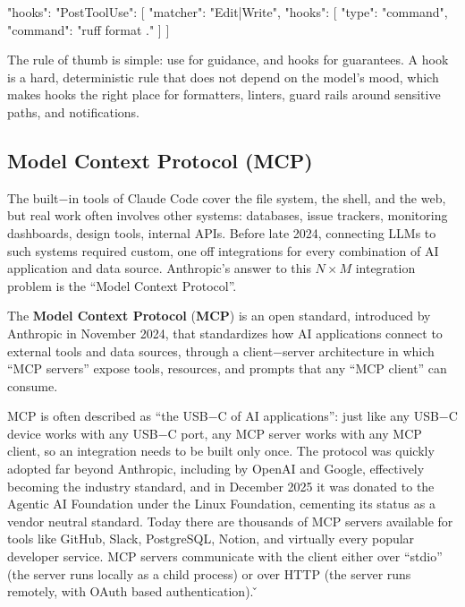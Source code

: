\begin{block}
{
  "hooks": {
    "PostToolUse": [
      {
        "matcher": "Edit|Write",
        "hooks": [
          {
            "type": "command",
            "command": "ruff format ."
          }
        ]
      }
    ]
  }
}
\end{block}

The rule of thumb is simple: use  for guidance, and hooks for guarantees. A hook is a hard,
deterministic rule that does not depend on the model's mood, which makes hooks the right place for formatters,
linters, guard rails around sensitive paths, and notifications.

\subsection{Model Context Protocol (MCP)}

The built$-$in tools of Claude Code cover the file system, the shell, and the web, but real work often involves other
systems: databases, issue trackers, monitoring dashboards, design tools, internal APIs. Before late 2024, connecting
LLMs to such systems required custom, one off integrations for every combination of AI application and data source.
Anthropic's answer to this $N \times M$ integration problem is the ``Model Context Protocol''.

The \textbf{Model Context Protocol} (\textbf{MCP}) is an open standard, introduced by Anthropic in November 2024,
that standardizes how AI applications connect to external tools and data sources, through a client$-$server
architecture in which ``MCP servers'' expose tools, resources, and prompts that any ``MCP client'' can consume.
\ed

MCP is often described as ``the USB$-$C of AI applications'': just like any USB$-$C device works with any USB$-$C
port, any MCP server works with any MCP client, so an integration needs to be built only once. The protocol was
quickly adopted far beyond Anthropic, including by OpenAI and Google, effectively becoming the industry standard, and
in December 2025 it was donated to the Agentic AI Foundation under the Linux Foundation, cementing its status as a
vendor neutral standard. Today there are thousands of MCP servers available for tools like GitHub, Slack, PostgreSQL,
Notion, and virtually every popular developer service. MCP servers communicate with the client either over ``stdio''
(the server runs locally as
a child process) or over HTTP (the server runs remotely, with OAuth based authentication). \v

